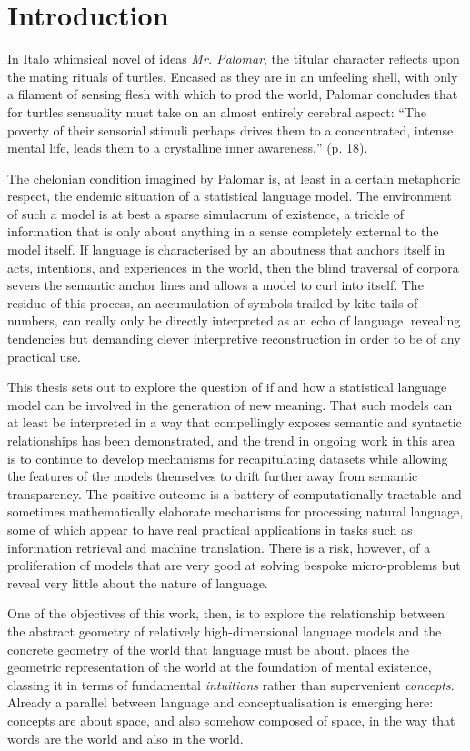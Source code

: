\chapter{Introduction}
In Italo  whimsical novel of ideas \emph{Mr. Palomar}, the titular character reflects upon the mating rituals of turtles.  Encased as they are in an unfeeling shell, with only a filament of sensing flesh with which to prod the world, Palomar concludes that for turtles sensuality must take on an almost entirely cerebral aspect: ``The poverty of their sensorial stimuli perhaps drives them to a concentrated, intense mental life, leads them to a crystalline inner awareness,'' (p. 18).

The chelonian condition imagined by Palomar is, at least in a certain metaphoric respect, the endemic situation of a statistical language model.  The environment of such a model is at best a sparse simulacrum of existence, a trickle of information that is only about anything in a sense completely external to the model itself.  If language is characterised by an aboutness that anchors itself in acts, intentions, and experiences in the world, then the blind traversal of corpora severs the semantic anchor lines and allows a model to curl into itself.  The residue of this process, an accumulation of symbols trailed by kite tails of numbers, can really only be directly interpreted as an echo of language, revealing tendencies but demanding clever interpretive reconstruction in order to be of any practical use.

This thesis sets out to explore the question of if and how a statistical language model can be involved in the generation of new meaning.  That such models can at least be interpreted in a way that compellingly exposes semantic and syntactic relationships has been demonstrated, and the trend in ongoing work in this area is to continue to develop mechanisms for recapitulating datasets while allowing the features of the models themselves to drift further away from semantic transparency.  The positive outcome is a battery of computationally tractable and sometimes mathematically elaborate mechanisms for processing natural language, some of which appear to have real practical applications in tasks such as information retrieval and machine translation.  There is a risk, however, of a proliferation of models that are very good at solving bespoke micro-problems but reveal very little about the nature of language.

One of the objectives of this work, then, is to explore the relationship between the abstract geometry of relatively high-dimensional language models and the concrete geometry of the world that language must be about.  \cite{Kant} places the geometric representation of the world at the foundation of mental existence, classing it in terms of fundamental \emph{intuitions} rather than supervenient \emph{concepts}.  Already a parallel between language and conceptualisation is emerging here: concepts are about space, and also somehow composed of space, in the way that words are the world and also in the world.

